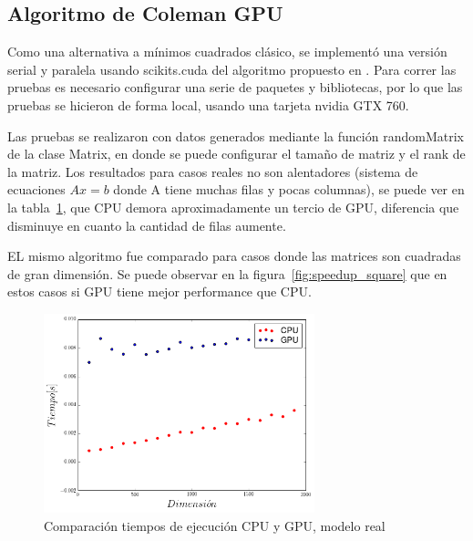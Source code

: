 \subsection{Algoritmo de Coleman GPU}
Como una alternativa a mínimos cuadrados clásico, se implementó una versión
serial y paralela usando scikits.cuda del algoritmo propuesto en
\cite{coleman2010}. Para correr las pruebas es necesario configurar una
serie de paquetes y bibliotecas, por lo que las pruebas se hicieron de forma
local, usando una tarjeta nvidia GTX 760. 

Las pruebas se realizaron con datos generados mediante la función randomMatrix
de la clase Matrix, en donde se puede configurar el tamaño de matriz y el rank
de la matriz. Los resultados para casos reales no son alentadores (sistema de
ecuaciones $Ax = b$ donde A tiene muchas filas y pocas columnas), se puede ver
en la tabla~\ref{fig:speedup_real}, que CPU demora aproximadamente un tercio de
GPU, diferencia que disminuye en cuanto la cantidad de filas aumente.

EL mismo algoritmo fue comparado para casos donde las matrices son cuadradas de
gran dimensión. Se puede observar en la figura~\ref{fig:speedup_square} que en
estos casos si GPU tiene mejor performance que CPU.

\begin{figure}[h!t]
    \begin{center}
        \includegraphics[width=0.7\textwidth]{images/speed_up_real}
        \caption{Comparación tiempos de ejecución CPU y GPU, modelo real}
        \label{fig:speedup_real}
    \end{center}
\end{figure}

